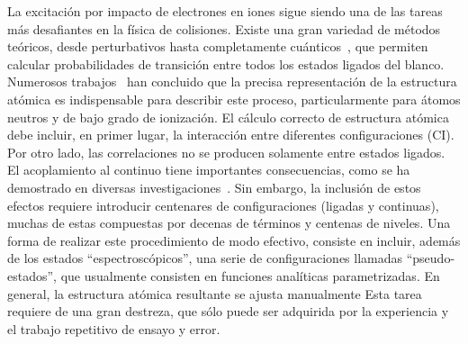 La excitación por impacto de electrones en iones sigue siendo una de las 
tareas más desafiantes en la física de colisiones. Existe una gran 
variedad de métodos teóricos, desde perturbativos hasta completamente 
cuánticos~\cite{Pindzola:07,Burke:11,Bray:17,Zatsarinny:04}, que 
permiten calcular probabilidades de transición entre todos los estados 
ligados del blanco. Numerosos trabajos~\cite{Bartschat:04,Zatsarinny:16,
Be_Ballance:03} han concluido que la precisa representación de la 
estructura atómica es indispensable para describir este proceso, 
particularmente para átomos neutros y de bajo grado de ionización. 
El cálculo correcto de estructura atómica debe incluir, en primer lugar, 
la interacción entre diferentes configuraciones (CI). Por otro lado, las 
correlaciones no se producen solamente entre estados ligados. El 
acoplamiento al continuo tiene importantes consecuencias, como se ha 
demostrado en diversas investigaciones~\cite{Ballance:03,Badnell:03,
Mitnik:03}. Sin embargo, la inclusión de estos efectos requiere 
introducir centenares de configuraciones 
(ligadas y continuas), muchas de estas compuestas por decenas de 
términos y centenas de niveles. Una forma de realizar este procedimiento 
de modo efectivo, consiste en incluir, además de los estados 
``espectroscópicos'', una serie de configuraciones llamadas 
``pseudo-estados'', que usualmente consisten en funciones analíticas 
parametrizadas. 
En general, la estructura atómica resultante se ajusta manualmente Esta
tarea requiere de una gran destreza, que sólo puede ser adquirida 
por la experiencia y el trabajo repetitivo de ensayo y error.


